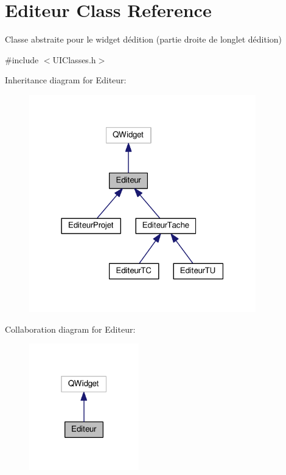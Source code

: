 \hypertarget{class_editeur}{}\section{Editeur Class Reference}
\label{class_editeur}


Classe abstraite pour le widget d\textquotesingle{}édition (partie droite de l\textquotesingle{}onglet d\textquotesingle{}édition)  




{\ttfamily \#include $<$U\+I\+Classes.\+h$>$}



Inheritance diagram for Editeur\+:\nopagebreak
\begin{figure}[H]
\begin{center}
\leavevmode
\includegraphics[width=279pt]{class_editeur__inherit__graph}
\end{center}
\end{figure}


Collaboration diagram for Editeur\+:\nopagebreak
\begin{figure}[H]
\begin{center}
\leavevmode
\includegraphics[width=135pt]{class_editeur__coll__graph}
\end{center}
\end{figure}
